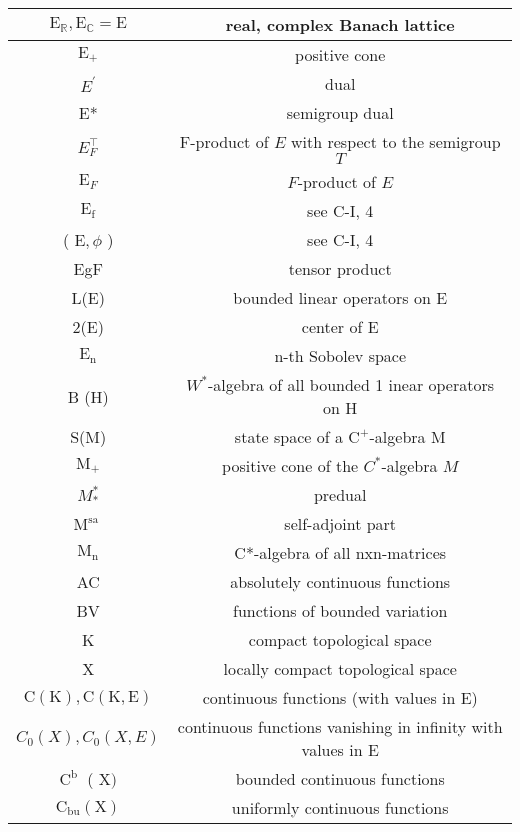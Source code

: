 \begin{tabular}{|c|c|}
\hline $\mathrm{E}_{\mathbb{R}}, \mathrm{E}_{\mathbb{C}}=\mathrm{E}$ & real, complex Banach lattice \\
\hline $\mathrm{E}_{+}$ & positive cone \\
\hline $E^{\prime}$ & dual \\
\hline E* & semigroup dual \\
\hline $E_{F}^{\top}$ & F-product of $E$ with respect to the semigroup $T$ \\
\hline $\mathrm{E}_{F}$ & $F$-product of $E$ \\
\hline $\mathrm{E}_{\mathrm{f}}$ & see C-I, 4 \\
\hline ( $\mathrm{E}, \phi$ ) & see C-I, 4 \\
\hline EgF & tensor product \\
\hline L(E) & bounded linear operators on E \\
\hline 2(E) & center of E \\
\hline $\mathrm{E}_{\mathrm{n}}$ & n-th Sobolev space \\
\hline B (H) & $W^{*}$-algebra of all bounded 1 inear operators on H \\
\hline S(M) & state space of a $\mathrm{C}^{+}$-algebra M \\
\hline $\mathrm{M}_{+}$ & positive cone of the $C^{*}$-algebra $M$ \\
\hline $M_{*}^{*}$ & predual \\
\hline $\mathrm{M}^{\text {sa }}$ & self-adjoint part \\
\hline $\mathrm{M}_{\mathrm{n}}$ & C*-algebra of all nxn-matrices \\
\hline AC & absolutely continuous functions \\
\hline BV & functions of bounded variation \\
\hline K & compact topological space \\
\hline X & locally compact topological space \\
\hline $\mathrm{C}(\mathrm{K}), \mathrm{C}(\mathrm{K}, \mathrm{E})$ & continuous functions (with values in E) \\
\hline $C_{0}(X), C_{0}(X, E)$ & continuous functions vanishing in infinity with values in E \\
\hline $\mathrm{C}^{\text {b }}$ ( X$)$ & bounded continuous functions \\
\hline $\mathrm{C}_{\mathrm{bu}}(\mathrm{X})$ & uniformly continuous functions \\

\end{tabular}
